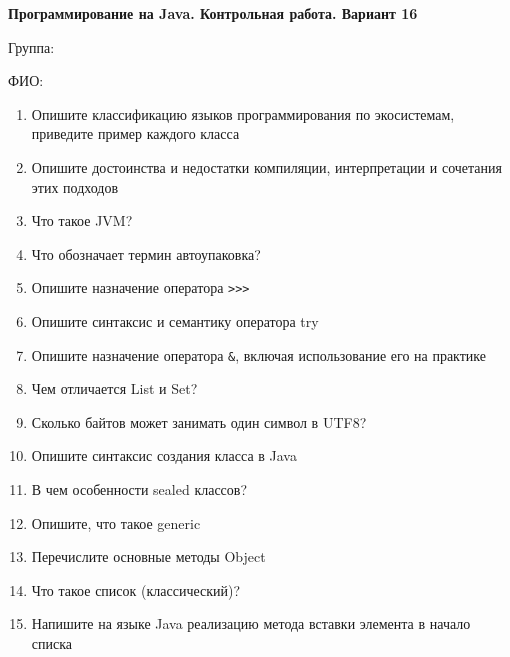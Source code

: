 \documentclass[12pt]{article}
\begin{document}
\newpage\begin{minipage}{\textwidth}
\textbf{Программирование на Java. Контрольная работа. Вариант 16}

Группа: \underline{\hspace{3cm}}

ФИО: \underline{\hspace{10cm}}

\begin{enumerate}
\item Опишите классификацию языков программирования по экосистемам, приведите пример каждого класса
\item Опишите достоинства и недостатки компиляции, интерпретации и сочетания этих подходов
\item Что такое JVM?
\item Что обозначает термин автоупаковка?
\item Опишите назначение оператора \verb|>>>|
\item Опишите синтаксис и семантику оператора try
\item Опишите назначение оператора \verb|&|, включая использование его на практике
\item Чем отличается List и Set?
\item Сколько байтов может занимать один символ в UTF8?
\item Опишите синтаксис создания класса в Java
\item В чем особенности sealed классов?
\item Опишите, что такое generic
\item Перечислите основные методы Object
\item Что такое список (классический)?
\item Напишите на языке Java реализацию метода вставки элемента в начало списка

\end{enumerate}
\end{minipage}
\end{document}
